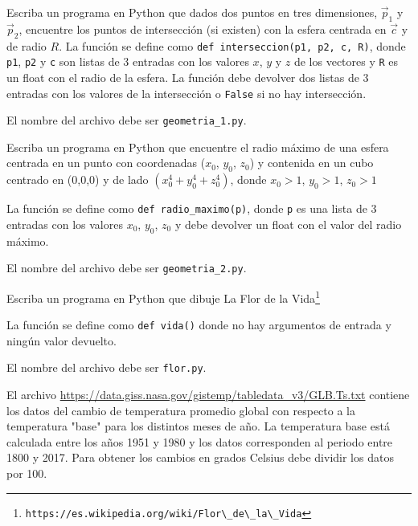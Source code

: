 \documentclass[11pt,letterpaper]{exam}
\begin{document}
\vspace{0.3cm}
\begin{questions}


Escriba un programa en Python que dados dos puntos en tres
dimensiones, $\vec{p}_1$ y $\vec{p}_2$, encuentre los puntos de
intersecci\'on (si existen) con la esfera centrada en $\vec{c}$ y de
radio $R$.  
La funci\'on se define como  \verb"def interseccion(p1, p2, c, R)",
donde \verb"p1", \verb"p2" y \verb"c" son listas de 3 entradas con los
valores $x$, $y$ y $z$ de los vectores y \verb"R" es un float con el
radio de la esfera.  
La funci\'on debe devolver dos listas de 3 entradas con los valores de
la intersecci\'on o \verb"False" si no hay intersecci\'on.  

El nombre del archivo debe ser \verb"geometria_1.py".


Escriba un programa en Python que encuentre el radio máximo de una
esfera centrada en un punto con coordenadas
($x_0$, $y_0$, $z_0$) y contenida en un cubo centrado en (0,0,0) y de
lado $(x_0^4+y_0^4+z_0^4)$, donde $x_0>1$, $y_0>1$, $z_0>1$

La funci\'on se define como  \verb"def radio_maximo(p)", donde
\verb"p" es una lista de 3 entradas con los valores $x_0$, $y_0$,
$z_0$ y debe devolver un float con el valor del radio m\'aximo.

El nombre del archivo debe ser \verb"geometria_2.py".


Escriba un programa en Python que dibuje La Flor de la Vida\footnote{\verb"https://es.wikipedia.org/wiki/Flor\_de\_la\_Vida"}

La funci\'on se define como  \verb"def vida()" donde no hay argumentos
de entrada y ning\'un valor devuelto.

El nombre del archivo debe ser \verb"flor.py".


El archivo \url{https://data.giss.nasa.gov/gistemp/tabledata_v3/GLB.Ts.txt}
 contiene los datos del cambio de temperatura promedio global con
respecto a la temperatura "base" para los distintos meses de año. La
temperatura base está calculada entre los años 1951 y 1980 y los datos
corresponden al periodo entre 1800 y 2017. Para obtener los cambios en
grados Celsius debe dividir los datos por 100.


\end{questions}
\end{document}
